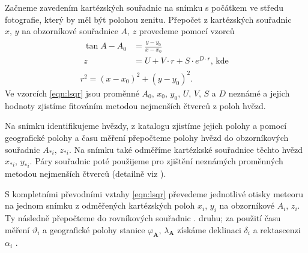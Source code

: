 Začneme zavedením kartézských souřadnic na snímku s počátkem ve středu fotografie, který by měl být polohou zenitu. Přepočet z kartézských souřadnic $x,\,y$ na obzorníkové souřadnice $A,\,z$ provedeme pomocí vzorců \cite{ceplecha}
\begin{eqnarray}
    \begin{aligned}
        \tan{A-A_0}&=\frac{y-y_0}{x-x_0}\\
        z&=U+V\cdot r+S\cdot e^{D\cdot r}\text{, kde}
    \end{aligned}\label{eqn:lsqr}\\
    r^2=(x-x_0)^2+(y-y_0)^2\text{.}
\end{eqnarray}
Ve vzorcích \eqref{eqn:lsqr} jsou proměnné $A_0,\,x_0,\,y_0,\,U,\,V,\,S$ a $D$ neznámé a jejich hodnoty zjistíme fitováním metodou nejmenších čtverců z poloh hvězd.

Na snímku identifikujeme hvězdy, z katalogu zjistíme jejich polohy a pomocí geografické polohy a času měření přepočteme polohy hvězd do obzorníkových souřadnic $A_{\ast i},\,z_{\ast i}$. Na snímku také odměříme kartézkské souřadnice těchto hvězd $x_{\ast i},\,y_{\ast i}$. Páry souřadnic poté použijeme pro zjištění neznámých proměnných metodou nejmenších čtverců (detailně viz \cite[223--224]{ceplecha}).

S kompletními převodními vztahy \eqref{eqn:lsqr} převedeme jednotlivé otisky meteoru na jednom snímku z odměřených kartézských poloh $x_i,\,y_i$ na obzorníkové $A_i,\,z_i$. Ty následně přepočteme do rovníkových souřadnic {\uppercase\expandafter{\relax}}. druhu; za použití času měření $\vartheta_i$ a geografické polohy stanice $\varphi_\mathbf{A},\,\lambda_\mathbf{A}$ získáme deklinaci $\delta_i$ a rektascenzi $\alpha_i$ \cite{ceplecha}.

